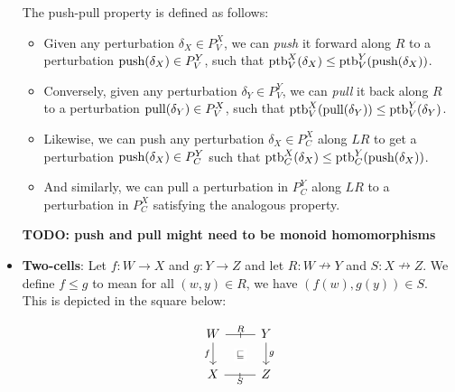 \begin{itemize}
    \vspace{3ex}

    The push-pull property is defined as follows:
    \begin{itemize}
        \item Given any perturbation $\delta_X \in P_V^X$, we can \emph{push} it forward along $R$ to a
        perturbation $\text{push}(\delta_X) \in P_V^Y$, such that $\text{ptb}_V^X(\delta_X) \le \text{ptb}_V^Y(\text{push}(\delta_X))$.

        \item Conversely, given any perturbation $\delta_Y \in P_V^Y$, we can \emph{pull} it back along $R$
        to a perturbation $\text{pull}(\delta_Y) \in P_V^X$, such that $\text{ptb}_V^X(\text{pull}(\delta_Y)) \le \text{ptb}_V^Y(\delta_Y)$.

        \item Likewise, we can push any perturbation $\delta_X \in P_C^X$ along $LR$
        to get a perturbation $\text{push}(\delta_X) \in P_C^Y$ such that
        $\text{ptb}_C^X(\delta_X) \le \text{ptb}_C^Y(\text{push}(\delta_X))$.

        \item And similarly, we can pull a perturbation in $P_C^Y$ along $LR$ to a perturbation in $P_C^X$
        satisfying the analogous property.
    \end{itemize}

    \textbf{TODO: push and pull might need to be monoid homomorphisms}

  \item \textbf{Two-cells}: Let $f : W \to X$ and $g : Y \to Z$ and let $R : W \nrightarrow Y$ and 
  $S : X \nrightarrow Z$. We define $f \le g$ to mean for all $(w, y) \in R$, we have
  $(f(w), g(y)) \in S$. This is depicted in the square below:

\[\begin{tikzcd}[ampersand replacement=\&]
	W \& Y \\
	X \& Z
	\arrow[""{name=0, anchor=center, inner sep=0}, "R", "\shortmid"{marking}, no head, from=1-1, to=1-2]
	\arrow[""{name=1, anchor=center, inner sep=0}, "S"', "\shortmid"{marking}, no head, from=2-1, to=2-2]
	\arrow["f"', from=1-1, to=2-1]
	\arrow["g", from=1-2, to=2-2]
	\arrow["\sqsubseteq"{description}, draw=none, from=0, to=1]
\end{tikzcd}\]
  
\end{itemize}

